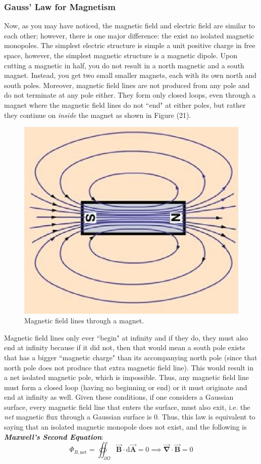 \documentclass{scrartcl}
\begin{document}
    \subsubsection{Gauss' Law for Magnetism}\newline
    Now, as you may have noticed, the magnetic field and electric field are similar to each other; however, there is one major difference: the exist no isolated magnetic monopoles. The simplest electric structure is simple a unit positive charge in free space, however, the simplest magnetic structure is a magnetic dipole. Upon cutting a magnetic in half, you do not result in a north magnetic and a south magnet. Instead, you get two small smaller magnets, each with its own north and south poles. Moreover, magnetic field lines are not produced from any pole and do not terminate at any pole either. They form only closed loops, even through a magnet where the magnetic field lines do not ``end" at either poles, but rather they continue on \textit{inside} the magnet as shown in Figure (21).
    \begin{figure}[H]
        \centering
        \includegraphics[scale=.5]{magnet.eps}
        \caption{Magnetic field lines through a magnet.}
    \end{figure}
    Magnetic field lines only ever ``begin" at infinity and if they do, they must also end at infinity because if it did not, then that would mean a south pole exists that has a bigger ``magnetic charge" than its accompanying north pole (since that north pole does not produce that extra magnetic field line). This would result in a net isolated magnetic pole, which is impossible. Thus, any magnetic field line must form a closed loop (having no beginning or end) or it must originate and end at infinity as well. Given these conditions, if one considers a Gaussian surface, every magnetic field line that enters the surface, must also exit, i.e. the \textit{net} magnetic flux through a Gaussian surface is 0. Thus, this law is equivalent to saying that an isolated magnetic monopole does not exist, and the following is \textit{\textbf{Maxwell's Second Equation}}: \[\Phi_{B,\text{net}}=\boxed{\oiint_{\partial\Omega}\vec{\mathbf B}\cdot\mathrm d\vec{\mathbf A}=0}\implies\boxed{\vec{\mathbf \nabla}\cdot\vec{\mathbf B}=0}\]
\end{document}
